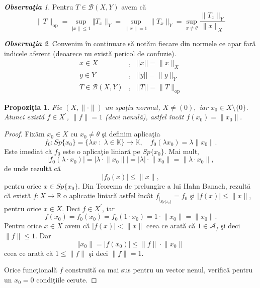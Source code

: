 \documentclass[ a4paper, 12pt]{report}
\newtheorem{prop}[theorem]{\bf Propozi\c tia }
\theoremstyle{definition}
\theoremstyle{remark}
\newtheorem{obs}{\bf Observa\c tia }[section]
\numberwithin{equation}{section}
\begin{document}
\begin{obs} Pentru $T \in \mathcal{B}(X,Y)$ avem c\u a
\[ \lVert  T \rVert_{\mbox{op}} = \sup\limits_{\Vert x \rVert \leq 1} \Vert T_x \rVert_{Y} = \sup\limits_{\lVert x \rVert = 1} \lVert T_x \rVert_{Y} = \sup\limits_{x \neq \theta} \frac{\lVert T_x \rVert_{Y}}{\lVert x \rVert_{X}} \]
\end{obs}

\begin{obs}
Convenim \^in continuare s\u a not\u am fiecare din normele ce apar far\u a indicele aferent (deoarece nu exist\u a pericol de confuzie).
\begin{eqnarray*}
x \in X&,& ||x|| =\lVert x \rVert_{X}\\
y \in Y&,& ||y|| = \lVert y \rVert_{Y}\\
T \in \mathcal{B}(X,Y)&,& ||T|| = \lVert T \rVert_{\mbox{op}}
\end{eqnarray*}
\end{obs}

\begin{prop}\label{p125}
Fie $(X, \lVert \cdot \rVert)$ un spa\c tiu normat, $X \neq (0),$ iar $x_0 \in X\setminus \{ 0 \}$. Atunci exist\u a $f \in X^{'}$, $\lVert f \rVert = 1$ (deci nenul\u a), astfel \^inc\^at $f(x_0) = \lVert x_0 \rVert.$
\end{prop}

\begin{proof}
Fix\u am $x_0 \in X$ cu $x_0 \neq \theta$ \c si definim aplica\c tia
$$f_0 : Sp\{ x_0\} = \{ \lambda  x \; : \; \lambda \in \mathbb{K} \} \rightarrow \mathbb{K},\quad  f_0(\lambda  x_0) = \lambda  \lVert x_0 \rVert. $$
Este imediat c\u a $f_0$ este o aplica\c tie liniar\u a pe $Sp\{ x_0 \}$. Mai mult,
$$\lvert f_0(\lambda \cdot x_0) \rvert = \lvert \lambda \cdot \lVert x_0 \rVert \rvert = \lvert \lambda \rvert \cdot \lVert x_0  \rVert = \lVert \lambda \cdot x_0 \rVert,$$ de unde rezult\u a c\u a $$\lvert f_0(x) \rvert \leq \lVert x \rVert,$$ pentru orice $x \in Sp\{x_0\}$. Din Teorema de prelungire a lui Hahn Banach, rezult\u a c\u a  exist\u a  $f : X \rightarrow \mathbb{R}$ o aplicatie liniar\u a astfel \^inc\^at $f_{|_{Sp\{x_0\}}} = f_0$ \c si $\lvert f(x) \rvert \leq \lVert x \rVert$, pentru orice $x \in X$. Deci $f \in X^{'}$, iar
$$f(x_0) = f_0(x_0) = f_0(1 \cdot x_0) = 1 \cdot \lVert x_0 \rVert = \lVert x_0 \rVert.$$
Pentru orice $x \in X$ avem c\u a $\lvert f(x) \rvert < \lVert x \rVert$ ceea ce arat\u a c\u a $1 \in \mathcal{A}_{f}$ \c si deci $\lVert f \rVert \leq 1$. Dar
$$\Vert x_0 \rVert = \lvert f(x_0) \rvert \leq \lVert f \rVert \cdot \lVert x_0 \rVert$$ ceea ce arat\u a c\u a $1 \leq \lVert f \rVert$ \c si deci $\lVert f \rVert = 1.$

Orice func\c tional\u a $f$ construit\u a ca mai sus pentru un vector nenul, verific\u a pentru un $x_0 = 0$ condi\c tiile cerute.
\end{proof}
\end{document}
